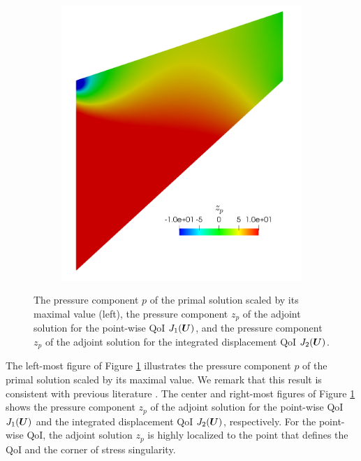 \begin{figure}[ht!]
\begin{subfigure}{.33\textwidth}
\end{subfigure}
\begin{subfigure}{.33\textwidth}
\centering
\includegraphics[width=.99\linewidth]{img/mech_cooks_avg_u_zp.png}
\end{subfigure}
\caption{The pressure component $p$ of the primal solution scaled by its
maximal value (left), the pressure component $z_p$ of the adjoint solution for
the point-wise QoI $J_1(\boldsymbol{U})$, and the pressure component $z_p$ of the
adjoint solution for the integrated displacement QoI $J_2(\boldsymbol{U})$.}
\label{fig:mech_cooks_pressures}
\end{figure}

The left-most figure of Figure \ref{fig:mech_cooks_pressures} illustrates
the pressure component $p$ of the primal solution scaled by its maximal
value. We remark that this result is consistent with previous literature
\cite{ostien2016tet}. The center and right-most figures of Figure
\ref{fig:mech_cooks_pressures} shows the pressure component $z_p$ of the
adjoint solution for the point-wise QoI $J_1(\boldsymbol{U})$ and the integrated
displacement QoI $J_2(\boldsymbol{U})$, respectively. For the point-wise QoI, the
adjoint solution $z_p$ is highly localized to the point that defines the
QoI and the corner of stress singularity.

